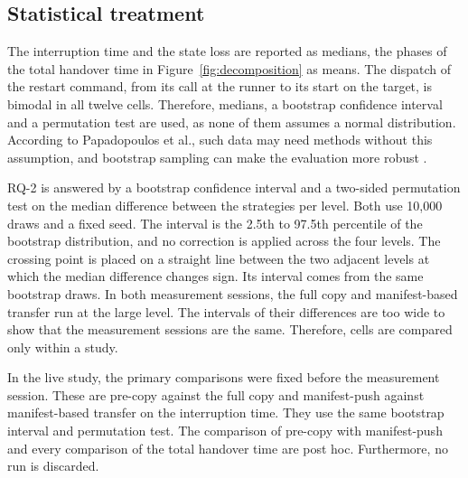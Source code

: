 \subsection{Statistical treatment}
The interruption time and the state loss are reported as medians, the phases of the total handover time in Figure~\ref{fig:decomposition} as means. The dispatch of the restart command, from its call at the runner to its start on the target, is bimodal in all twelve cells. Therefore, medians, a bootstrap confidence interval and a permutation test are used, as none of them assumes a normal distribution. According to Papadopoulos et al., such data may need methods without this assumption, and bootstrap sampling can make the evaluation more robust \cite{papadopoulos2019methodological}.

RQ-2 is answered by a bootstrap confidence interval and a two-sided permutation test on the median difference between the strategies per level. Both use 10,000 draws and a fixed seed. The interval is the 2.5th to 97.5th percentile of the bootstrap distribution, and no correction is applied across the four levels. The crossing point is placed on a straight line between the two adjacent levels at which the median difference changes sign. Its interval comes from the same bootstrap draws. In both measurement sessions, the full copy and manifest-based transfer run at the large level. The intervals of their differences are too wide to show that the measurement sessions are the same. Therefore, cells are compared only within a study.

In the live study, the primary comparisons were fixed before the measurement session. These are pre-copy against the full copy and manifest-push against manifest-based transfer on the interruption time. They use the same bootstrap interval and permutation test. The comparison of pre-copy with manifest-push and every comparison of the total handover time are post hoc. Furthermore, no run is discarded.
